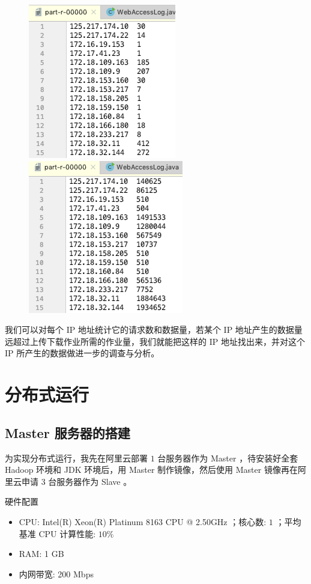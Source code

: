 \documentclass{article}
\begin{document}
\begin{figure}[!ht]
\centering
\includegraphics[scale=0.5]{image/12.png}
\includegraphics[scale=0.5]{image/13.png}
\end{figure}

我们可以对每个 IP 地址统计它的请求数和数据量，若某个 IP 地址产生的数据量远超过上传下载作业所需的作业量，我们就能把这样的 IP 地址找出来，并对这个 IP 所产生的数据做进一步的调查与分析。

\section{分布式运行}

\subsection{Master 服务器的搭建}

为实现分布式运行，我先在阿里云部署 $1$ 台服务器作为 Master ，待安装好全套 Hadoop 环境和 JDK 环境后，用 Master 制作镜像，然后使用 Master 镜像再在阿里云申请 $3$ 台服务器作为 Slave 。

硬件配置
\begin{itemize}
\item CPU: Intel(R) Xeon(R) Platinum 8163 CPU @ 2.50GHz ；核心数: $1$ ；平均基准 CPU 计算性能: $10\%$
\item RAM: 1 GB
\item 内网带宽: 200 Mbps
\end{itemize}
\end{document}
